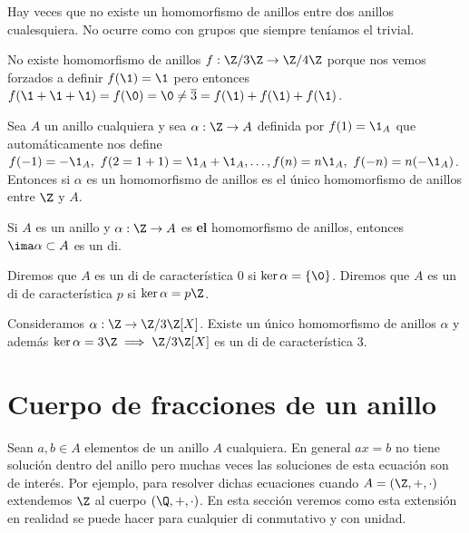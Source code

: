\begin{obs}
	Hay veces que no existe un homomorfismo de anillos entre dos anillos cualesquiera. No ocurre como con grupos que siempre teníamos el trivial.
\end{obs}

\begin{ej}
	No existe homomorfismo de anillos $f:\Z/3\Z \to \Z/4\Z$ porque nos vemos forzados a definir $f(\1) = \1$ pero entonces $f(\1 + \1 + \1) = f(\0) = \0 \neq \overline{3} = f(\1) + f(\1) + f(\1)$.
\end{ej}

\begin{pro}
	Sea $A$ un anillo cualquiera y sea $\alpha: \Z \to A$ definida por $f(1) = \1_A$ que automáticamente nos define $f(-1) = -\1_A,\ f(2 = 1+1) = \1_A + \1_A, \dots, f(n) = n\1_A,\ f(-n) = n(-\1_A)$. Entonces si $\alpha$ es un homomorfismo de anillos es el único homomorfismo de anillos entre $\Z$ y $A$.
\end{pro}

\begin{pro}
	Si $A$ es un anillo y $\alpha: \Z \to A$ es \textbf{el} homomorfismo de anillos, entonces $\ima \alpha \subset A$ es un \gls{di}.
\end{pro}

\begin{dfn}
	Diremos que $A$ es un \gls{di} de característica 0 si $\ker \alpha = \{\0\}$. Diremos que $A$ es un \gls{di} de característica $p$ si $\ker \alpha = p\Z$.
\end{dfn}

\begin{ej}
	Consideramos $\alpha: \Z \to \Z/3\Z[X]$. Existe un único homomorfismo de anillos $\alpha$ y además $\ker \alpha = 3\Z \implies \Z/3\Z[X]$ es un \gls{di} de característica 3.
\end{ej}

\section{Cuerpo de fracciones de un anillo}

Sean $a,b \in A$ elementos de un anillo $A$ cualquiera. En general $ax = b$ no tiene solución dentro del anillo pero muchas veces las soluciones de esta ecuación son de interés. Por ejemplo, para resolver dichas ecuaciones cuando $A = (\Z, +, \cdot)$ extendemos $\Z$ al cuerpo $(\Q, +, \cdot)$. En esta sección veremos como esta extensión en realidad se puede hacer para cualquier \gls{di} conmutativo y con unidad.

